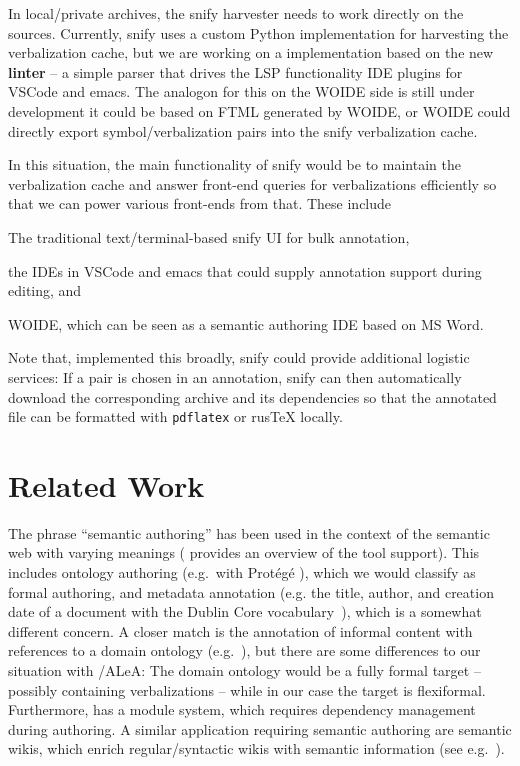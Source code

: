 \documentclass[runningheads]{llncs}
\newcommand\ALeA{\textsf{ALeA}\xspace}
\newcommand\snify{\textsf{snify}\xspace}
\newcommand\FTML{\textsf{FTML}\xspace}
\newcommand\WOIDE{\textsf{WOIDE}\xspace}
\begin{document}
In local/private archives, the \snify harvester needs to work directly on the \sTeX
sources.
Currently, \snify uses a custom Python implementation for harvesting the verbalization cache,
but we are working on a implementation based on the new \flams \textbf{linter} -- a simple \sTeX parser that
drives the LSP functionality \sTeX IDE plugins for \textsf{VSCode} and \textsf{emacs}.
The analogon for this on the \WOIDE side is still under development it
could be based on \FTML generated by \WOIDE, or \WOIDE could directly export symbol/verbalization
pairs into the \snify verbalization cache.

In this situation, the main functionality of \snify would be to maintain the verbalization cache
and answer front-end queries for verbalizations efficiently so that we can power various
front-ends from that. These include
\begin{compactenum}[\em i\rm)]
\item The traditional text/terminal-based \snify UI for bulk annotation,
\item the \sTeX IDEs in \textsf{VSCode} and \textsf{emacs} that could supply annotation
  support during editing, and 
\item \WOIDE, which can be seen as a semantic authoring IDE based on MS Word.
\end{compactenum}

Note that, implemented this broadly, \snify could provide additional logistic services: If a
pair is chosen in an annotation, \snify can then automatically download the corresponding
archive and its dependencies so that the annotated file can be formatted with \texttt{pdflatex} or
\textsf{rus\TeX} locally.

\section{Related Work}\label{sec:relwork}
The phrase ``semantic authoring'' has been used in the
context of the semantic web with varying meanings
(\cite{khalili2013user} provides an overview of the tool support).
This includes ontology authoring (e.g.\ with \textsf{Prot{\'e}g{\'e}}
\cite{musen2015protege}), which we would classify as
formal authoring, and metadata annotation
(e.g. the title, author, and creation date of a document with the Dublin Core vocabulary~\cite{DublinCore:on}),
which is a somewhat different concern.
A closer match is the annotation of
informal content with references to a domain ontology (e.g.\ \cite{goerz2010adaptation}),
but there are some differences to
our situation with \sTeX/\ALeA: The domain ontology would be a fully formal target --
possibly containing verbalizations -- while in our case the target is flexiformal.
Furthermore, \sTeX has a module system, which requires dependency management during
authoring.
A similar application requiring semantic authoring
are semantic wikis, which enrich regular/syntactic
wikis with semantic information
(see e.g.\ \cite{semmediawiki}).
\end{document}
